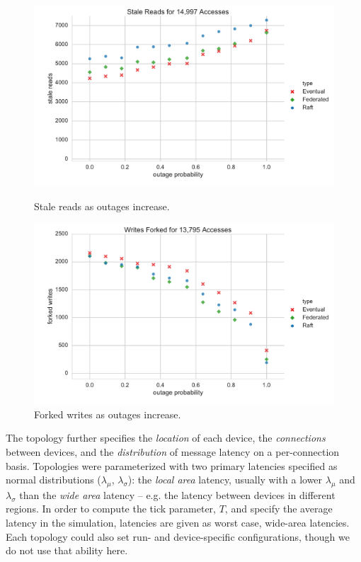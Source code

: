 \documentclass[10pt,conference,letterpaper]{IEEEtran}
\begin{document}
\begin{figure}[t]
    \centering
      \includegraphics[width=\linewidth]{figures/outages/stale_reads}
      \caption{Stale reads as outages increase.}\label{fig:outages_stale_reads}
    \endminipage
      \includegraphics[width=\linewidth]{figures/outages/forked_writes}
      \caption{Forked writes as outages increase.}\label{fig:outages_forked_writes}
    \endminipage\hfill
\end{figure}

The topology further specifies the \textit{location} of each device, the
\textit{connections} between devices, and the \textit{distribution} of message latency on
a per-connection basis.
Topologies were parameterized with two primary latencies specified as normal distributions ($\lambda_{\mu}$,
$\lambda_{\sigma}$): the \textit{local area} latency, usually with a lower $\lambda_{\mu}$
and $\lambda_{\sigma}$ than the \textit{wide area} latency -- e.g.
the latency between devices in different regions.
In order to compute the tick parameter, $T$, and specify the average latency in the
simulation, latencies are given as worst case, wide-area latencies.
Each topology could also set run- and device-specific configurations, though we
do not use that ability here.
\end{document}
